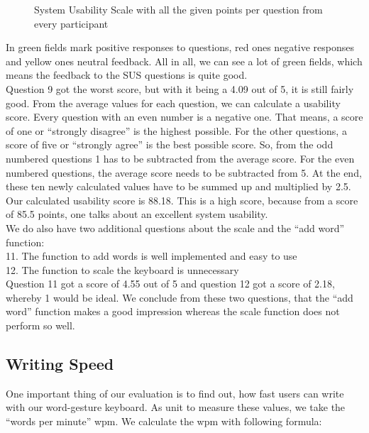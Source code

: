 \fi
\begin{figure}[H]
    \noindent
    \vspace*{-10em}
    \caption{System Usability Scale with all the given points per question from every participant}
    \label{fig:SUS_score}
\end{figure}

In  green fields mark positive responses to questions, red ones negative responses and yellow ones neutral feedback. All in all, we can see a lot of green fields, which means the feedback to the SUS questions is quite good.\\
Question 9 got the worst score, but with it being a 4.09 out of 5, it is still fairly good. From the average values for each question, we can calculate a usability score. Every question with an even number is a negative one. That means, a score of one or ``strongly disagree'' is the highest possible. For the other questions, a score of five or ``strongly agree'' is the best possible score. So, from the odd numbered questions 1 has to be subtracted from the average score. For the even numbered questions, the average score needs to be subtracted from 5. At the end, these ten newly calculated values have to be summed up and multiplied by 2.5. Our calculated usability score is 88.18. This is a high score, because from a score of 85.5 points, one talks about an excellent system usability.\\
We do also have two additional questions about the scale and the ``add word'' function:\\
11. The function to add words is well implemented and easy to use\\
12. The function to scale the keyboard is unnecessary\\
Question 11 got a score of 4.55 out of 5 and question 12 got a score of 2.18, whereby 1 would be ideal. We conclude from these two questions, that the ``add word'' function makes a good impression whereas the scale function does not perform so well.\\

\subsection{Writing Speed}
One important thing of our evaluation is to find out, how fast users can write with our word-gesture keyboard. As unit to measure these values, we take the ``words per minute'' wpm. We calculate the wpm with following formula: 

